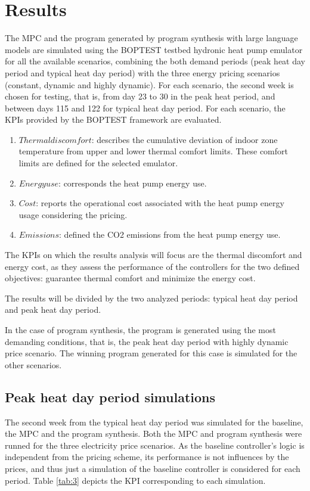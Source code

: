 \newpage
\section{Results}
\label{sec:boptest-results}
The MPC and the program generated by program synthesis with large language models are simulated using the BOPTEST testbed hydronic heat pump emulator for all the available scenarios, combining the both demand periods (peak heat day period and typical heat day period) with the three energy pricing scenarios (constant, dynamic and highly dynamic). For each scenario, the second week is chosen for testing, that is, from day 23 to 30 in the peak heat period, and between days 115 and 122 for typical heat day period.
For each scenario, the KPIs provided by the BOPTEST framework are evaluated.
 \begin{enumerate}
     \item $Thermal discomfort$: describes the cumulative deviation of indoor zone temperature from upper and lower thermal comfort limits. These comfort limits are defined for the selected emulator.
     \item $Energy use$: corresponds the heat pump energy use.
     \item $Cost$: reports the operational cost associated with the heat pump energy usage considering the pricing.
     \item $Emissions$: defined the CO2 emissions from the heat pump energy use.
 \end{enumerate}
The KPIs on which the results analysis will focus are the thermal discomfort and energy cost, as they assess the performance of the controllers for the two defined objectives: guarantee thermal comfort and minimize the energy cost.

The results will be divided by the two analyzed periods: typical heat day period and peak heat day period.

In the case of program synthesis, the program is generated using the most demanding conditions, that is, the peak heat day period with highly dynamic price scenario. The winning program generated for this case is simulated for the other scenarios.

\newpage
\subsection{Peak heat day period simulations}
\label{'results_peak'}
The second week from the typical heat day period was simulated for the baseline, the MPC and the program synthesis. Both the MPC and program synthesis were runned for the three electricity price scenarios. As the baseline controller's logic is independent from the pricing scheme, its performance is not influences by the prices, and thus just a simulation of the baseline controller is considered for each period. Table \ref{tab:3} depicts the KPI corresponding to each simulation.

